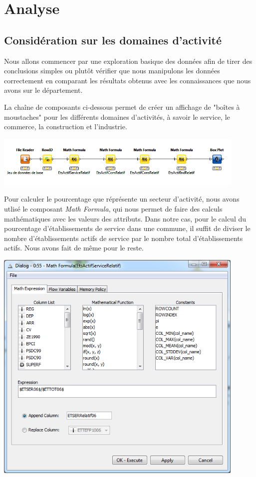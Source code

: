 \section{Analyse}

\subsection{Considération sur les domaines d'activité}

Nous allons commencer par une exploration basique des données afin de tirer des conclusions simples ou plutôt vérifier que nous manipulons les données correctement en comparant les résultats obtenus avec les connaissances que nous avons sur le département.

La chaîne de composants ci-dessous permet de créer un affichage de "boîtes à moustaches" pour les différents domaines d'activités, à savoir le service, le commerce, la construction et l'industrie.

\begin{center}
	\includegraphics[width=0.9\textwidth]{png/BoxPlotDomainesActivité_knime.png}
\end{center}

Pour calculer le pourcentage que réprésente un secteur d'activité, nous avons utlisé le composant \textit{Math Formula}, qui nous permet de faire des calculs mathématiques avec les valeurs des attributs. Dans notre cas, pour le calcul du pourcentage d'établissements de service dans une commune, il suffit de diviser le nombre d'établissements actifs de service par le nombre total d'établissements actifs. Nous avons fait de même pour le reste.

\begin{center}
	\includegraphics[width=0.9\textwidth]{png/MathFormulaEtsActifServiceRelatif.png}
\end{center}


